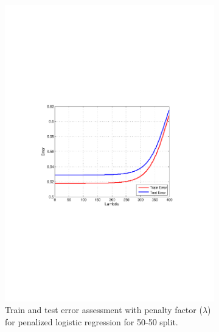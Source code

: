 {\begin{figure}[h]
  \begin{subfigure}[b]{0.5\textwidth}
   \includegraphics[clip, trim=4cm 9cm 3cm 10cm, width=\textwidth]{figures/Lambda_pLG.pdf}
    \caption{Train and test error assessment with penalty factor ($\lambda$) for penalized logistic regression
    for 50-50 split.}
    \label{fig:Lambda_pLr}
  \end{subfigure}
  \hfill
  \begin{subfigure}[b]{0.45\textwidth}

\end{subfigure}
\end{figure}}
